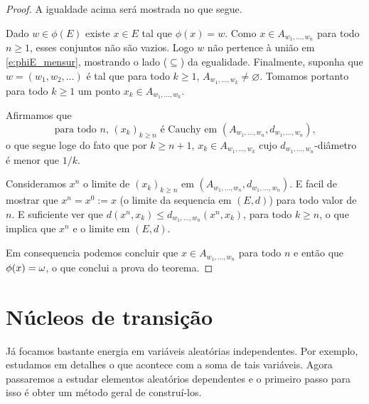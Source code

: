 \begin{topics}
\begin{proof}
  A igualdade acima será mostrada no que segue.

  Dado $w \in \phi(E)$ existe $x \in E$ tal que $\phi(x) = w$.
  Como $x \in A_{w_1, \dots, w_n}$ para todo $n \geq 1$, esses conjuntos não são vazios.
  Logo $w$ não pertence à união em \eqref{e:phiE_mensur}, mostrando o lado ($\subseteq$) da egualidade.
  Finalmente, suponha que $w = (w_1, w_2, \dots)$ é tal que para todo $k \geq 1$, $A_{w_1, \dots, w_k} \neq \varnothing$.
  Tomamos portanto para todo $k \geq 1$ um ponto $x_k \in A_{w_1, \dots, w_k}$.

  Afirmamos que
  \begin{equation}
    \text{para todo $n$, $(x_k)_{k \geq n}$ é Cauchy em $(A_{w_1, \dots, w_n}, d_{w_1, \dots, w_n})$,}
  \end{equation}
 o que segue loge do fato que por $k \geq n+1$, $x_k \in A_{w_1, \dots, w_{k}}$ cujo $d_{w_1, \dots, w_{n}}$-diâmetro é menor que $1/k$.

 \medskip

 Consideramos $x^n$ o limite de $(x_k)_{k\ge n}$ em $(A_{w_1, \dots, w_n}, d_{w_1, \dots, w_n})$.
 E facil de mostrar que $x^n=x^0:=x$ (o limite da sequencia em $(E,d)$) para todo valor de $n$.
 E suficiente ver que  $d(x^n,x_k)\le d_{w_1, \dots, w_n}(x^n,x_k)$, para todo $k\ge n$, o que implica que $x^n$ e o limite em $(E,d)$.

 \medskip

 Em consequencia podemos concluir que $x\in A_{w_1, \dots, w_n}$ para todo $n$ e então que $\phi(x)=\omega$, o que conclui a prova do teorema.
\end{proof}



\end{topics}


\section{Núcleos de transição}


Já focamos bastante energia em variáveis aleatórias independentes.
Por exemplo, estudamos em detalhes o que acontece com a soma de tais variáveis.
Agora passaremos a estudar elementos aleatórios dependentes e o primeiro passo para isso é obter um método geral de construí-los.

